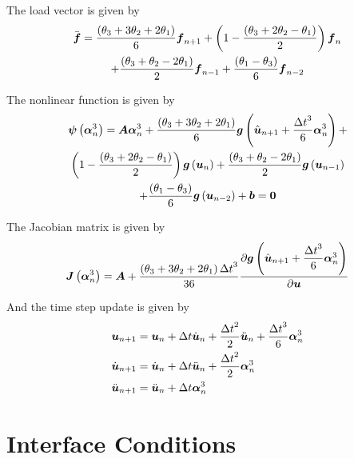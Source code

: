 The load vector is given by
\begin{multline}
  \bar{ \boldsymbol{f} }=\dfrac{\left( \theta_{3}+3\theta_{2}+2\theta_{1} \right)}{6} \boldsymbol{f} _{n+1}
  +\left( 1-\dfrac{\left( \theta_{3}+2\theta_{2}-\theta_{1} \right)}{2} \right) \boldsymbol{f} _{n} \\
  +\dfrac{\left( \theta_{3}+\theta_{2}-2\theta_{1} \right)}{2} \boldsymbol{f} _{n-1}
  +\dfrac{\left( \theta_{1}-\theta_{3} \right)}{6} \boldsymbol{f} _{n-2}
\end{multline}

The nonlinear function is given by
\begin{multline}
  \fnof{\vectr{\psi}}{\vectr{\alpha}^{3}_{n}}=\matr{A}\vectr{\alpha}^{3}_{n}+\dfrac{\pbrac{\theta_{3}+3\theta_{2}+2\theta_{1}}}{6}
  \fnof{\vectr{g}}{\hat{\vectr{u}}_{n+1}+\dfrac{{\Delta t}^{3}}{6}\vectr{\alpha}^{3}_{n}}+\\
  \pbrac{1-\dfrac{\pbrac{\theta_{3}+2\theta_{2}-\theta_{1}}}{2}}\fnof{\vectr{g}}{\vectr{u}_{n}}
  +\dfrac{\pbrac{\theta_{3}+\theta_{2}-2\theta_{1}}}{2}\fnof{\vectr{g}}{\vectr{u}_{n-1}} \\
  +\dfrac{\pbrac{\theta_{1}-\theta_{3}}}{6}\fnof{\vectr{g}}{\vectr{u}_{n-2}}
  +\vectr{b}=\vectr{0}
\end{multline}

The Jacobian matrix is given by
\begin{equation}
  \fnof{\matr{J}}{\vectr{\alpha}^{3}_{n}}=\matr{A}+\dfrac{\pbrac{\theta_{3}+3\theta_{2}+2\theta_{1}}{\Delta t}^{3}}{36}
  \delby{\fnof{\vectr{g}}{\hat{\vectr{u}}_{n+1}+\dfrac{{\Delta t}^{3}}{6}\vectr{\alpha}^{3}_{n}}}{\vectr{u}}
\end{equation}

And the time step update is given by
\begin{equation}
  \begin{split}
     \boldsymbol{u} _{n+1} &=  \boldsymbol{u} _{n}+\Delta t\dot{ \boldsymbol{u} }_{n}
    +\dfrac{{\Delta t}^{2}}{2}\ddot{ \boldsymbol{u} }_{n}
    +\dfrac{{\Delta t}^{3}}{6} \boldsymbol{\alpha} ^{3}_{n} \\
    \dot{ \boldsymbol{u} }_{n+1} &= \dot{ \boldsymbol{u} }_{n}+\Delta t\ddot{ \boldsymbol{u} }_{n}+\dfrac{{\Delta t}^{2}}{2} \boldsymbol{\alpha} ^{3}_{n} \\
    \ddot{ \boldsymbol{u} }_{n+1} &= \ddot{ \boldsymbol{u} }_{n}+\Delta t \boldsymbol{\alpha} ^{3}_{n} \\
  \end{split}
\end{equation}

\section{Interface Conditions}

